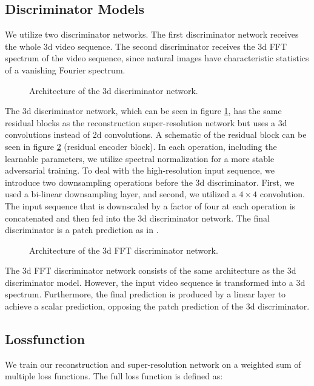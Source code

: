 \documentclass[10pt,twocolumn,letterpaper]{article}
\begin{document}
	\subsection{Discriminator Models} \label{subsec:discriminator}
	We utilize two discriminator networks. The first discriminator network receives the whole 3d video sequence. The second discriminator receives the 3d FFT spectrum of the video sequence, since natural images have characteristic statistics of a vanishing Fourier spectrum. \cite{deepfovea}\\
	
	\begin{figure}[htbp!]
		\centering
		
		\caption{Architecture of the 3d discriminator network.}
		\label{fig:discriminatornetwork}
	\end{figure}
	
	The 3d discriminator network, which can be seen in figure \ref{fig:discriminatornetwork}, has the same residual blocks as the reconstruction super-resolution network but uses a 3d convolutions instead of 2d convolutions. A schematic of the residual block can be seen in figure \ref{fig:fftdiscriminatornetwork} (residual encoder block). In each operation, including the learnable parameters, we utilize spectral normalization \cite{spectralnorm} for a more stable adversarial training. To deal with the high-resolution input sequence, we introduce two downsampling operations before the 3d discriminator. First, we used a bi-linear downsampling layer, and second, we utilized a $4\times 4$ convolution. The input sequence that is downscaled by a factor of four at each operation is concatenated and then fed into the 3d discriminator network. The final discriminator is a patch prediction as in \cite{patchgan}.
	
	\begin{figure}[htbp!]
		\centering
		
		\caption{Architecture of the 3d FFT discriminator network.}
		\label{fig:fftdiscriminatornetwork}
	\end{figure}
	
	The 3d FFT discriminator network consists of the same architecture as the 3d discriminator model. However, the input video sequence is transformed into a 3d spectrum. Furthermore, the final prediction is produced by a linear layer to achieve a scalar prediction, opposing the patch prediction of the 3d discriminator. \cite{deepfovea}
	
	\subsection{Lossfunction} \label{subsec:lossfunction}
	We train our reconstruction and super-resolution network on a weighted sum of multiple loss functions. The full loss function is defined as:
	
\end{document}
